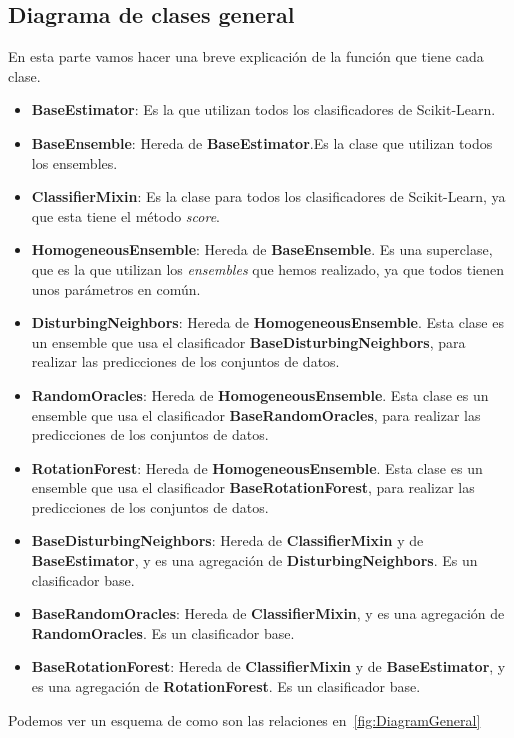 \subsection{Diagrama de clases general}\label{diagram-general}
En esta parte vamos hacer una breve explicación de la función que tiene cada clase.
\begin{itemize}
	\item \textbf{BaseEstimator}: Es la que utilizan todos los clasificadores de Scikit-Learn.
	\item \textbf{BaseEnsemble}: Hereda de \textbf{BaseEstimator}.Es la clase que utilizan todos los ensembles.
	\item \textbf{ClassifierMixin}: Es la clase para todos los clasificadores de Scikit-Learn, ya que esta tiene el método \textit{score}.
	\item \textbf{HomogeneousEnsemble}: Hereda de \textbf{BaseEnsemble}. Es una superclase, que es la que utilizan los \textit{ensembles}  que hemos realizado, ya que todos tienen unos parámetros en común.
	\item \textbf{DisturbingNeighbors}: Hereda de \textbf{HomogeneousEnsemble}. Esta clase es un ensemble que usa el clasificador \textbf{BaseDisturbingNeighbors}, para realizar las predicciones de los conjuntos de datos.
	\item \textbf{RandomOracles}: Hereda de \textbf{HomogeneousEnsemble}. Esta clase es un ensemble que usa el clasificador \textbf{BaseRandomOracles}, para realizar las predicciones de los conjuntos de datos.
	\item \textbf{RotationForest}: Hereda de \textbf{HomogeneousEnsemble}. Esta clase es un ensemble que usa el clasificador \textbf{BaseRotationForest}, para realizar las predicciones de los conjuntos de datos.
	\item \textbf{BaseDisturbingNeighbors}: Hereda de \textbf{ClassifierMixin} y de \textbf{BaseEstimator}, y es una agregación de \textbf{DisturbingNeighbors}. Es un clasificador base.
	\item \textbf{BaseRandomOracles}: Hereda de \textbf{ClassifierMixin}, y es una agregación de \textbf{RandomOracles}. Es un clasificador base.
	\item \textbf{BaseRotationForest}: Hereda de \textbf{ClassifierMixin} y de \textbf{BaseEstimator}, y es una agregación de \textbf{RotationForest}. Es un clasificador base.
\end{itemize}
Podemos ver un esquema de como son las relaciones en~\ref{fig:DiagramGeneral}

